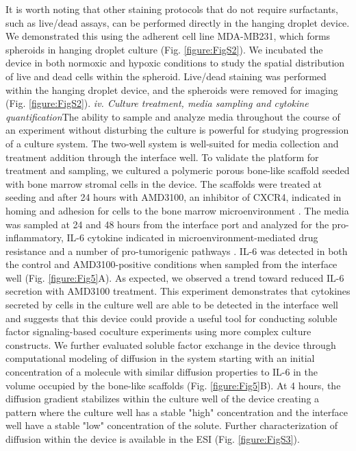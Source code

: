 It is worth noting that other staining protocols that do not require surfactants, such as live/dead assays, can be performed directly in the hanging droplet device. We demonstrated this using the adherent cell line MDA-MB231, which forms spheroids in hanging droplet culture (Fig. \ref{figure:FigS2}). We incubated the device in both normoxic and hypoxic conditions to study the spatial distribution of live and dead cells within the spheroid. Live/dead staining was performed within the hanging droplet device, and the spheroids were removed for imaging (Fig. \ref{figure:FigS2}). 
\newline
\textit{iv. Culture treatment, media sampling and cytokine quantification}The ability to sample and analyze media throughout the course of an experiment without disturbing the culture is powerful for studying progression of a culture system. The two-well system is well-suited for media collection and treatment addition through the interface well. To validate the platform for treatment and sampling, we cultured a polymeric porous bone-like scaffold seeded with bone marrow stromal cells in the device. The scaffolds were treated at seeding and after 24 hours with AMD3100, an inhibitor of CXCR4, indicated in homing and adhesion for cells to the bone marrow microenvironment \cite{Alsayed2007, Burger2006}. The media was sampled at 24 and 48 hours from the interface port and analyzed for the pro-inflammatory, IL-6 cytokine indicated in microenvironment-mediated drug resistance and a number of pro-tumorigenic pathways \cite{Hodge2005, Roodman2001a, Vincent2005, Lin2007}. IL-6 was detected in both the control and AMD3100-positive conditions when sampled from the interface well (Fig. \ref{figure:Fig5}A). As expected, we observed a trend toward reduced IL-6 secretion with AMD3100 treatment. This experiment demonstrates that cytokines secreted by cells in the culture well are able to be detected in the interface well and suggests that this device could provide a useful tool for conducting soluble factor signaling-based coculture experiments using more complex culture constructs. We further evaluated soluble factor exchange in the device through computational modeling of diffusion in the system starting with an initial concentration of a molecule with similar diffusion properties to IL-6 in the volume occupied by the bone-like scaffolds (Fig. \ref{figure:Fig5}B). At 4 hours, the diffusion gradient stabilizes within the culture well of the device creating a pattern where the culture well has a stable "high" concentration and the interface well have a stable "low" concentration of the solute. Further characterization of diffusion within the device is available in the ESI (Fig. \ref{figure:FigS3}).    

